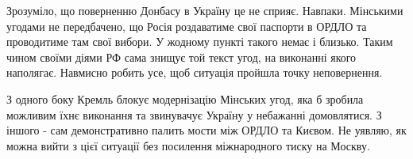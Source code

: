 Зрозуміло, що поверненню Донбасу в Україну це не сприяє. Навпаки. Мінськими
угодами не передбачено, що Росія роздаватиме свої паспорти в ОРДЛО та
проводитиме там свої вибори. У жодному пункті такого немає і близько. Таким
чином своїми діями РФ сама знищує той текст угод, на виконанні якого наполягає.
Навмисно робить усе, щоб ситуація пройшла точку неповернення.

З одного боку Кремль блокує модернізацію Мінських угод, яка б зробила можливим
їхнє виконання та звинувачує Україну у небажанні домовлятися. З іншого - сам
демонстративно палить мости між ОРДЛО та Києвом. Не уявляю, як можна вийти з
цієї ситуації без посилення міжнародного тиску на Москву.

